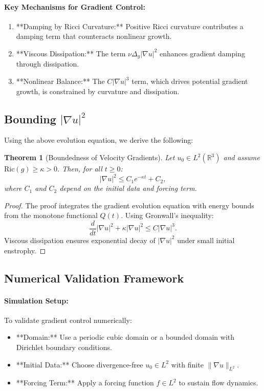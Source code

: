 \documentclass[12pt]{article}
\newtheorem{theorem}{Theorem}[section]
\theoremstyle{definition}
\begin{document}
\paragraph{Key Mechanisms for Gradient Control:}
\begin{enumerate}
    \item **Damping by Ricci Curvature:** Positive Ricci curvature contributes a damping term that counteracts nonlinear growth.
    \item **Viscous Dissipation:** The term $\nu \Delta_g |\nabla u|^2$ enhances gradient damping through dissipation.
    \item **Nonlinear Balance:** The $C |\nabla u|^3$ term, which drives potential gradient growth, is constrained by curvature and dissipation.
\end{enumerate}

\subsection{Bounding $|\nabla u|^2$}
Using the above evolution equation, we derive the following:
\begin{theorem}[Boundedness of Velocity Gradients]
Let $u_0 \in L^2(\mathbb{R}^3)$ and assume $\text{Ric}(g) \geq \kappa > 0$. Then, for all $t \geq 0$:
\begin{equation}
|\nabla u|^2 \leq C_1 e^{-\kappa t} + C_2,
\end{equation}
where $C_1$ and $C_2$ depend on the initial data and forcing term.
\end{theorem}

\begin{proof}
The proof integrates the gradient evolution equation with energy bounds from the monotone functional $Q(t)$. Using Gronwall’s inequality:
\begin{equation}
\frac{d}{dt} |\nabla u|^2 + \kappa |\nabla u|^2 \leq C |\nabla u|^3.
\end{equation}
Viscous dissipation ensures exponential decay of $|\nabla u|^2$ under small initial enstrophy.
\end{proof}

\subsection{Numerical Validation Framework}

\paragraph{Simulation Setup:}
To validate gradient control numerically:
\begin{itemize}
    \item **Domain:** Use a periodic cubic domain or a bounded domain with Dirichlet boundary conditions.
    \item **Initial Data:** Choose divergence-free $u_0 \in L^2$ with finite $\|\nabla u\|_{L^2}$.
    \item **Forcing Term:** Apply a forcing function $f \in L^2$ to sustain flow dynamics.
\end{itemize}
\end{document}
